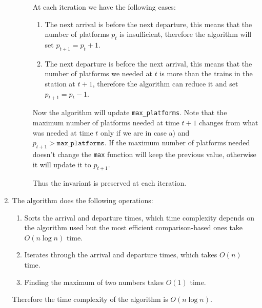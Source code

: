 \documentclass[10pt]{article}
\begin{document}
\begin{enumerate}
\begin{description}
                  At each iteration we have the following cases:
                  \begin{enumerate}[label=\alph*)]
                      \item The next arrival is before the next departure, this means that the number of platforms $p_t$ is insufficient, therefore the algorithm will set $p_{t + 1} = p_t + 1$.
                      \item The next departure is before the next arrival, this means that the number of platforms we needed at $t$ is more than the trains in the station at $t+1$, therefore the algorithm can reduce it and set $p_{t + 1} = p_t - 1$.
                  \end{enumerate}

                  Now the algorithm will update \texttt{max\_platforms}.
                  Note that the maximum number of platforms needed at time $t + 1$ changes from what was needed at time $t$ only if we are in case a) and $p_{t + 1} > \texttt{max\_platforms}$. If the maximum number of platforms needed doesn't change the \texttt{max} function will keep the previous value, otherwise it will update it to $p_{t + 1}$.

                  Thus the invariant is preserved at each iteration.
          \end{description}

    \item The algorithm does the following operations:
          \begin{enumerate}[label=\alph*)]
              \item Sorts the arrival and departure times, which time complexity depends on the algorithm used but the most efficient comparison-based ones take $O(n \log n)$ time.
              \item Iterates through the arrival and departure times, which takes $O(n)$ time.
              \item Finding the maximum of two numbers takes $O(1)$ time.
          \end{enumerate}
          Therefore the time complexity of the algorithm is $O(n \log n)$.
\end{enumerate}
\end{document}

